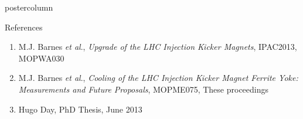 \documentclass[final,hyperref={pdfpagelabels=false}]{beamer}
\begin{document}
\begin{frame}
\begin{columns}
\begin{column}{.49\textwidth}
\begin{beamercolorbox}[center,wd=\textwidth]{postercolumn}
\begin{minipage}[T]{.95\textwidth}
{\vfill
\begin{block}{References}
\begin{enumerate}
\item{\small{M.J. Barnes \emph{et al}., \emph{Upgrade of the LHC Injection Kicker Magnets}, IPAC2013, MOPWA030}}
\item{\small{M.J. Barnes \emph{et al}., \emph{Cooling of the LHC Injection Kicker Magnet Ferrite Yoke: Measurements and Future Proposals}, MOPME075, These proceedings}}
\item{\small{Hugo Day, PhD Thesis, June 2013}}
\end{enumerate}
\end{block}
         \vfill
          }
        \end{minipage}
      \end{beamercolorbox}
    \end{column}


\end{columns}
\end{frame}
\end{document}
